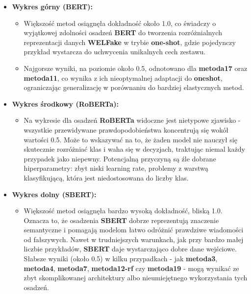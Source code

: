 \begin{itemize}
	\item \textbf{Wykres górny (BERT):}
	      \begin{itemize}
		      \item Większość metod osiągnęła dokładność około 1.0, co świadczy o wyjątkowej zdolności osadzeń \textbf{BERT} do tworzenia rozróżnialnych reprezentacji danych \textbf{WELFake} w trybie \textbf{one-shot}, gdzie pojedynczy przykład wystarcza do uchwycenia unikalnych cech zestawu.
		      \item Najgorsze wyniki, na poziomie około 0.5, odnotowano dla \textbf{metoda17} oraz \textbf{metoda11}, co wynika z ich nieoptymalnej adaptacji do \newline\textbf{one\-shot}, ograniczając generalizację w porównaniu do bardziej elastycznych metod.
	      \end{itemize}

	\item \textbf{Wykres środkowy (RoBERTa):}
	      \begin{itemize}
		      \item Na wykresie dla osadzeń \textbf{RoBERTa} widoczne jest nietypowe zjawisko - wszystkie przewidywane prawdopodobieństwa koncentrują się wokół wartości 0.5. Może to wskazywać na to, że żaden model nie nauczył się skutecznie rozróżniać klas i waha się w decyzjach, traktując niemal każdy przypadek jako niepewny. Potencjalną przyczyną są źle dobrane hiperparametry: zbyt niski learning rate, problemy z warstwą klasyfikującą, która jest niedostosowana do liczby klas.
	      \end{itemize}

	\item \textbf{Wykres dolny (SBERT):}
	      \begin{itemize}
		      \item Większość metod osiągnęła bardzo wysoką dokładność, bliską 1.0. Oznacza to, że osadzenia \textbf{SBERT} dobrze reprezentują znaczenie semantyczne i pomagają modelom łatwo odróżnić prawdziwe wiadomości od fałszywych. Nawet w trudniejszych warunkach, jak przy bardzo małej liczbie przykładów, \textbf{SBERT} daje wystarczająco dobre dane wejściowe. Słabsze wyniki (około 0.5) w kilku przypadkach - jak \textbf{metoda3}, \textbf{metoda4}, \textbf{metoda7}, \textbf{metoda12-rf} czy \textbf{metoda19} - mogą wynikać ze zbyt skomplikowanej architektury albo nieumiejętnego wykorzystania tych osadzeń.
	      \end{itemize}
\end{itemize}


